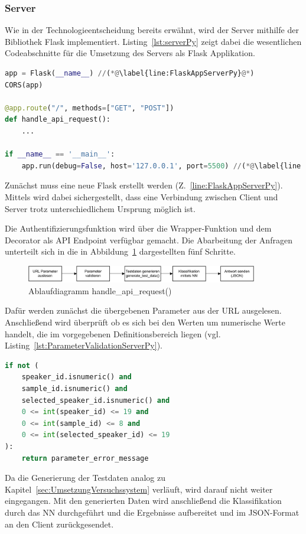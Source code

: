 \subsubsection{Server} \label{sec:UmsetzungServer}
Wie in der Technologieentscheidung bereits erwähnt, wird der Server mithilfe der Bibliothek Flask implementiert.
Listing~\ref{lst:serverPy} zeigt dabei die wesentlichen Codeabschnitte für die Umsetzung des Servers als Flask Applikation.
\begin{lstlisting}[language=Python,caption=Ausschnitt server.py,label=lst:serverPy]
app = Flask(__name__) //(*@\label{line:FlaskAppServerPy}@*)
CORS(app)

@app.route("/", methods=["GET", "POST"])
def handle_api_request():
    ...

if __name__ == '__main__':
    app.run(debug=False, host='127.0.0.1', port=5500) //(*@\label{line:AppRunServerPy}@*)
\end{lstlisting}
Zunächst muss eine neue Flask  erstellt werden (Z.~\ref{line:FlaskAppServerPy}).
Mittels  wird dabei sichergestellt, dass eine Verbindung zwischen Client und Server trotz unterschiedlichem Ursprung möglich ist.

Die Authentifizierungsfunktion wird über die Wrapper-Funktion  und dem Decorator  als \ac{API} Endpoint verfügbar gemacht.
Die Abarbeitung der Anfragen unterteilt sich in die in Abbildung~\ref{fig:AblaufdiagrammServerHandleApiRequest} dargestellten fünf Schritte.
\begin{figure}[H]
    \centering
    \includegraphics[width=0.9\textwidth, keepaspectratio]{images/AblaufdiagrammServerHandleApiRequest.pdf}
    \caption{Ablaufdiagramm handle\_api\_request()}
    \label{fig:AblaufdiagrammServerHandleApiRequest}
\end{figure}
Dafür werden zunächst die übergebenen Parameter aus der URL ausgelesen.
Anschließend wird überprüft ob es sich bei den Werten um numerische Werte handelt, die im vorgegebenen Definitionsbereich liegen (vgl. Listing~\ref{lst:ParameterValidationServerPy}).
\begin{lstlisting}[language=Python,caption=Parametervalidierung handle\_api\_request() - server.py,label=lst:ParameterValidationServerPy]
if not (
    speaker_id.isnumeric() and 
    sample_id.isnumeric() and 
    selected_speaker_id.isnumeric() and
    0 <= int(speaker_id) <= 19 and
    0 <= int(sample_id) <= 8 and
    0 <= int(selected_speaker_id) <= 19
):
    return parameter_error_message
\end{lstlisting}
Da die Generierung der Testdaten analog zu Kapitel~\ref{sec:UmsetzungVersuchssystem} verläuft, wird darauf nicht weiter eingegangen.
Mit den generierten Daten wird anschließend die Klassifikation durch das \ac{NN} durchgeführt und die Ergebnisse aufbereitet und im JSON-Format an den Client zurückgesendet.

